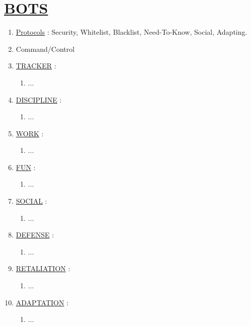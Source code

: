 \documentclass[11pt]{article}
\begin{document}
\section*{\ul{BOTS}}
\begin{enumerate}
	\item[] \ul{Protocols} : Security, Whitelist, Blacklist, Need-To-Know, Social, Adapting.
	\item[] Command/Control
	
	\item[] \ul{TRACKER} :
	\begin{enumerate}
		\item[] ...
	\end{enumerate}

	\item[] \ul{DISCIPLINE} :
	\begin{enumerate}
		\item[] ...
	\end{enumerate}

	\item[] \ul{WORK} :
	\begin{enumerate}
		\item[] ...
	\end{enumerate}

	\item[] \ul{FUN} :
	\begin{enumerate}
		\item[] ...
	\end{enumerate}

	\item[] \ul{SOCIAL} :
	\begin{enumerate}
		\item[] ...
	\end{enumerate}

	\item[] \ul{DEFENSE} :
	\begin{enumerate}
		\item[] ...
	\end{enumerate}

	\item[] \ul{RETALIATION} :
	\begin{enumerate}
		\item[] ...
	\end{enumerate}

	\item[] \ul{ADAPTATION} :
	\begin{enumerate}
		\item[] ...
	\end{enumerate}
\end{enumerate}
\end{document}
